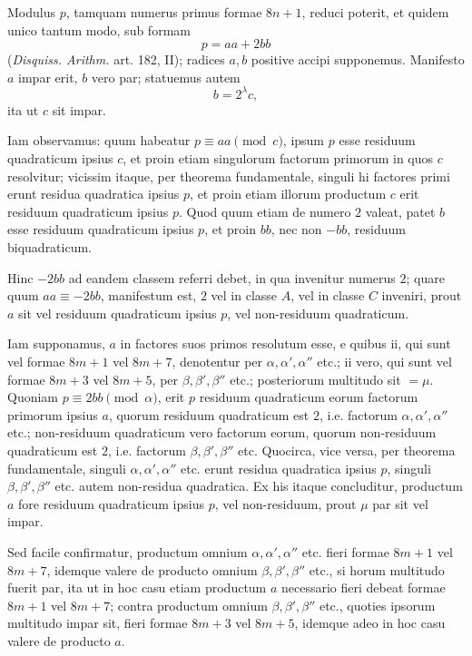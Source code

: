 \documentclass[12pt]{article}
\begin{document}
Modulus $p$, tamquam numerus primus formae $8n+1$, reduci poterit, et quidem unico tantum modo, sub formam
\[
p=aa+2bb
\]
(\emph{Disquiss. Arithm.} art. 182, II); radices $a,b$ positive accipi supponemus. Manifesto $a$ impar erit, $b$ vero par; statuemus autem
\[
b=2^\lambda c,
\]
ita ut $c$ sit impar.

Iam observamus: quum habeatur $p\equiv aa\pmod c$, ipsum $p$ esse residuum quadraticum ipsius $c$, et proin etiam singulorum factorum primorum in quos $c$ resolvitur; vicissim itaque, per theorema fundamentale, singuli hi factores primi erunt residua quadratica ipsius $p$, et proin etiam illorum productum $c$ erit residuum quadraticum ipsius $p$. Quod quum etiam de numero $2$ valeat, patet $b$ esse residuum quadraticum ipsius $p$, et proin $bb$, nec non $-bb$, residuum biquadraticum.

Hinc $-2bb$ ad eandem classem referri debet, in qua invenitur numerus $2$; quare quum $aa\equiv -2bb$, manifestum est, $2$ vel in classe $A$, vel in classe $C$ inveniri, prout $a$ sit vel residuum quadraticum ipsius $p$, vel non-residuum quadraticum.

Iam supponamus, $a$ in factores suos primos resolutum esse, e quibus ii, qui sunt vel formae $8m+1$ vel $8m+7$, denotentur per $\alpha,\alpha',\alpha''$ etc.; ii vero, qui sunt vel formae $8m+3$ vel $8m+5$, per $\beta,\beta',\beta''$ etc.; posteriorum multitudo sit $=\mu$. Quoniam $p\equiv 2bb\pmod \alpha$, erit $p$ residuum quadraticum eorum factorum primorum ipsius $a$, quorum residuum quadraticum est $2$, i.e. factorum $\alpha,\alpha',\alpha''$ etc.; non-residuum quadraticum vero factorum eorum, quorum non-residuum quadraticum est $2$, i.e. factorum $\beta,\beta',\beta''$ etc. Quocirca, vice versa, per theorema fundamentale, singuli $\alpha,\alpha',\alpha''$ etc. erunt residua quadratica ipsius $p$, singuli $\beta,\beta',\beta''$ etc. autem non-residua quadratica. Ex his itaque concluditur, productum $a$ fore residuum quadraticum ipsius $p$, vel non-residuum, prout $\mu$ par sit vel impar.

Sed facile confirmatur, productum omnium $\alpha,\alpha',\alpha''$ etc. fieri formae $8m+1$ vel $8m+7$, idemque valere de producto omnium $\beta,\beta',\beta''$ etc., si horum multitudo fuerit par, ita ut in hoc casu etiam productum $a$ necessario fieri debeat formae $8m+1$ vel $8m+7$; contra productum omnium $\beta,\beta',\beta''$ etc., quoties ipsorum multitudo impar sit, fieri formae $8m+3$ vel $8m+5$, idemque adeo in hoc casu valere de producto $a$.
\end{document}
